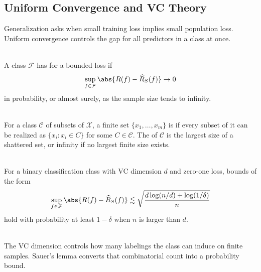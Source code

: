 \subsection{Uniform Convergence and VC Theory}

Generalization asks when small training loss implies small population loss.  Uniform convergence controls the gap for all predictors in a class at once.

\begin{definition} \label{def:sl-uniform-convergence} \\
A class $\mathcal{F}$ has  for a bounded loss if
\[
\sup_{f\in\mathcal{F}}\abs{R(f)-\widehat{R}_S(f)}\to0
\]
in probability, or almost surely, as the sample size tends to infinity.
\end{definition}

\begin{definition} \label{def:sl-vc-dimension} \\
For a class $\mathcal{C}$ of subsets of $\mathcal{X}$, a finite set $\{x_1,\ldots,x_m\}$ is  if every subset of it can be realized as $\{x_i:x_i\in C\}$ for some $C\in\mathcal{C}$.  The  of $\mathcal{C}$ is the largest size of a shattered set, or infinity if no largest finite size exists.
\end{definition}

\begin{theorem} \label{thm:sl-vc-generalization-form} \\
For a binary classification class with VC dimension $d$ and zero-one loss, bounds of the form
\[
\sup_{f\in\mathcal{F}}\abs{R(f)-\widehat{R}_S(f)}
\lesssim
\sqrt{\frac{d\log(n/d)+\log(1/\delta)}{n}}
\]
hold with probability at least $1-\delta$ when $n$ is larger than $d$.
\end{theorem}

\begin{remark} \label{rem:sl-growth-functions} \\
The VC dimension controls how many labelings the class can induce on finite samples.  Sauer's lemma converts that combinatorial count into a probability bound.
\end{remark}
